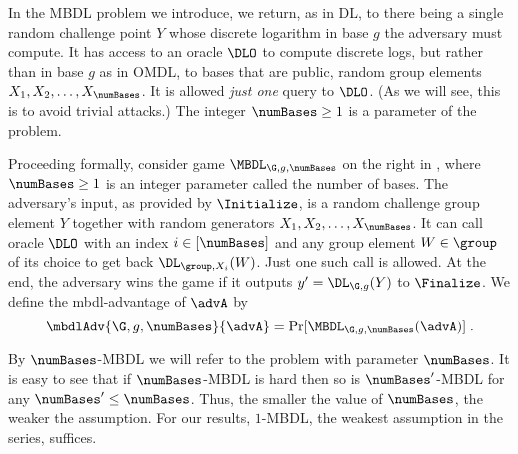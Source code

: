 In the MBDL problem we introduce, we return, as in DL, to there being a single random challenge point $Y$ whose discrete logarithm in base $g$ the adversary must compute. It has access to an oracle $\DLO$ to compute discrete logs, but rather than in base $g$ as in OMDL, to bases that are public, random group elements $X_1, X_2, \ldots, X_{\numBases}$. It is allowed \textit{just one} query to $\DLO$.
(As we will see, this is to avoid trivial attacks.) The integer $\numBases\geq 1$ is a parameter of the problem.

Proceeding formally, consider game $\MBDL_{\G, g, \numBases}$ on the right in , where $\numBases \geq 1$ is an integer parameter called the number of bases. The adversary's input, as provided by $\Initialize$, is a random challenge group element $Y$ together with random generators $X_1,X_2,\ldots,X_{\numBases}$. It can call oracle $\DLO$ with an index $i \in [\numBases]$ and any group element $W\in\group$ of its choice to get back $\DL_{\group,X_i}(W)$. Just one such call is allowed. 
At the end, the adversary wins the game if it outputs $y' = \DL_{\G, g}(Y)$ to $\Finalize$. We define the mbdl-advantage of $\advA$ by
$$\mbdlAdv{\G, g, \numBases}{\advA} = \Pr[\MBDL_{\G, g, \numBases}(\advA)]\;.$$




 By $\numBases$-MBDL we will refer to the problem with parameter $\numBases$. It is easy to see that if $\numBases$-MBDL is hard then so is $\numBases'$-MBDL for any $\numBases'\leq\numBases$. Thus, the smaller the value of $\numBases$, the weaker the assumption. For our results, $1$-MBDL, the weakest assumption in the series, suffices. %

